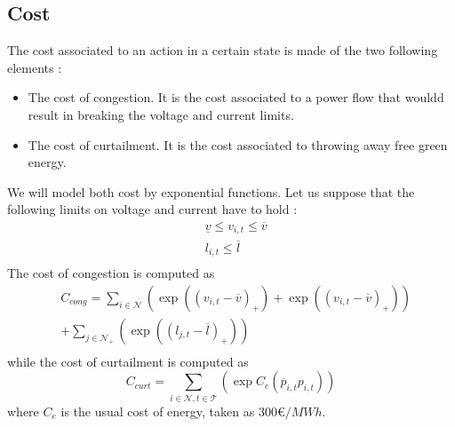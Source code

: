 \subsection{Cost}
The cost associated to an action in a certain state is made of the two following elements :
\begin{itemize}
\item The cost of congestion. It is the cost associated to a power flow that wouldd result in breaking the voltage and current limits.
\item The cost of curtailment. It is the cost associated to throwing away free green energy.
\end{itemize}

We will model both cost by exponential functions.
Let us suppose that the following limits on voltage and current have to hold :
$$
\begin{aligned}
& \underline{v} \le v_{i,t} \le \overline{v}\\
& l_{i,t} \le \overline{l} \\
\end{aligned}
$$
The cost of congestion is computed as
$$
\begin{aligned}
& C_{cong} = \sum_{i \in \mathcal{N}} \left(\exp{\left((v_{i,t}-\overline{v})_+\right)} + \exp{\left((v_{i,t}-\overline{v})_+\right)}\right)  \\
&+ \sum_{j \in \mathcal{N}_+} \left(\exp{\left((l_{j,t}-\overline{l})_+\right)} \right) \\
\end{aligned}
$$
while the cost of curtailment is computed as
$$C_{curt} = \sum_{i \in \mathcal{N},t \in \mathcal{T}} \left( \exp{C_e(\overline{p}_{i,t}p_{i,t})} \right)$$
where $C_e$ is the usual cost of energy, taken as $300 \euro /MWh$.
